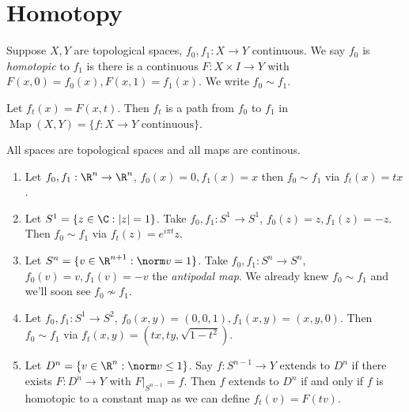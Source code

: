 \documentclass[a4paper]{article}
\DeclareMathOperator{\Map}{Map} %
\begin{document}


\tableofcontents

\setcounter{section}{-1}

\section{Homotopy}

\begin{definition}[homotopy]
  Suppose \(X, Y\) are topological spaces, \(f_0, f_1: X \to Y\) continuous. We say \(f_0\) is \emph{homotopic} to \(f_1\) is there is a continuous \(F: X \times I \to Y\) with \(F(x, 0) = f_0(x), F(x, 1) = f_1(x)\). We write \(f_0 \sim f_1\).
\end{definition}

Let \(f_t(x) = F(x, t)\). Then \(f_t\) is a path from \(f_0\) to \(f_1\) in \(\Map(X, Y) = \{f: X \to Y \text{ continuous}\}\).

\begin{convention}
  All spaces are topological spaces and all maps are continous.
\end{convention}

\begin{eg}\leavevmode
  \begin{enumerate}
  \item Let \(f_0, f_1: \R^n \to \R^n\), \(f_0(x) = 0, f_1(x) = x\) then \(f_0 \sim f_1\) via \(f_t(x) = tx\).
  \item Let \(S^1 = \{z \in \C: |z| = 1\}\). Take \(f_0, f_1: S^1 \to S^1\), \(f_0(z) = z, f_1(z) = -z\). Then \(f_0 \sim f_1\) via \(f_t(z) = e^{i\pi t}z\).
  \item Let \(S^n = \{v \in \R^{n + 1}: \norm v = 1\}\). Take \(f_0, f_1: S^n \to S^n\), \(f_0(v) = v, f_1(v) = -v\) the \emph{antipodal map}. We already knew \(f_0 \sim f_1\) and we'll soon see \(f_0 \nsim f_1\).
  \item Let \(f_0, f_1: S^1 \to S^2\), \(f_0(x, y) = (0, 0, 1), f_1(x, y) = (x, y, 0)\). Then \(f_0 \sim f_1\) via \(f_t(x, y) = (tx, ty, \sqrt{1 - t^2})\).
  \item Let \(D^n = \{v \in \R^n: \norm v \leq 1\}\). Say \(f: S^{n - 1} \to Y\) extends to \(D^n\) if there exists \(F: D^n \to Y\) with \(F|_{S^{n - 1}} = f\). Then \(f\) extends to \(D^n\) if and only if \(f\) is homotopic to a constant map as we can define \(f_t(v) = F(tv)\).
  \end{enumerate}
\end{eg}
\end{document}

